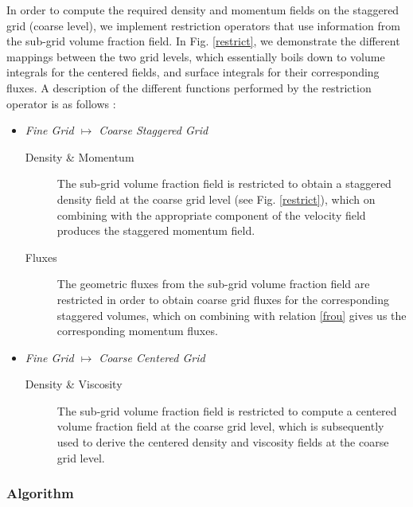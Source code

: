 In order to compute the required density and momentum fields
on the staggered grid (coarse level), we implement restriction operators
that use information from the sub-grid volume fraction field.  
In Fig. \ref{restrict}, we demonstrate the different 
mappings between the two grid levels, which essentially boils down 
to volume integrals for the centered fields, and surface integrals 
for their corresponding fluxes.
A description of the different functions performed by the restriction 
operator is as follows : 

\begin{itemize}
	\item \textit{Fine Grid $\longmapsto$ Coarse Staggered Grid}
          
	  \begin{description}
		  \item[Density \& Momentum] The sub-grid volume fraction field
			  is restricted to obtain a staggered density field at the 
			  coarse grid level (see Fig. \ref{restrict}), which on combining with 
			  the appropriate component of the velocity field 
			  produces the staggered momentum field.    
		  \item[Fluxes] The geometric fluxes from the sub-grid volume fraction 
			field are restricted in order to obtain coarse grid fluxes for the 
			 corresponding staggered volumes, which on combining with 
			  relation \eqref{frou} gives us the corresponding momentum fluxes.   
	  \end{description}

  \item \textit{Fine Grid $\longmapsto$ Coarse Centered Grid}

          \begin{description}
		  \item[Density \& Viscosity] The sub-grid volume fraction field is 
			  restricted to compute a centered volume fraction field at the 
			  coarse grid level, which is subsequently used to derive the  
			  centered density and viscosity fields at the coarse grid level.   
	  \end{description}

\end{itemize}


\subsubsection*{Algorithm}

